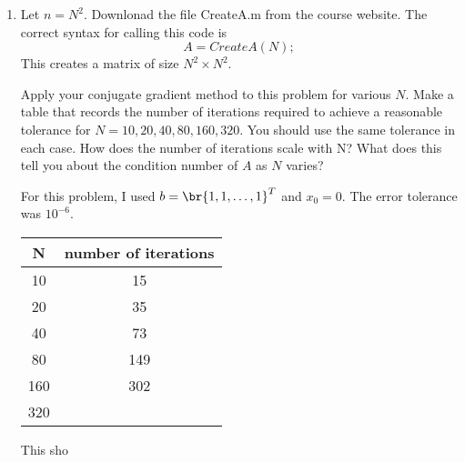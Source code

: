 \documentclass[11pt, oneside]{article}
\begin{document}
\begin{enumerate}
    \begin{proof}
      Let $A$ be symmetric and positive definite and
      let $p_0, p_1, \ldots, p_l$ be A-conjugate, that is
      \[
        p_i^T A p_j = 0 \qquad \forall i \neq j.
      \]
      Consider a set of constants $c_0, c_1, \ldots, c_l$, such that
      \[
        \sum{i = 0}{l}{c_i p_i} = 0
      \]
      The set of vectors $\set{p_i}$ are linearly independent if $c_i = 0$ for
      all $i$.
      Consider the following
      \begin{align*}
        0 &= \sum{i = 0}{l}{c_i p_i^T} A \sum{j = 0}{l}{c_j p_j} \\
        0 &= \sum{i = 0}{l}{\sum{j = 0}{l}{c_i c_j  p_i^T A p_j}}
        \intertext{Since these vectors are A-conjugate}
        0 &= \sum{i = 0}{l}{c_i^2 p_i^T A p_i}.
        \intertext{Note that since $A$ is positive definite $p_i^T A p_i > 0$
          for all $i$, and since $c_i^2 \ge 0$ this implies that}
        0 &= c_i
      \end{align*}
      This shows that $p_0, p_1, \ldots, p_l$ are linearly independent.
      Therefore any set of A-conjugate vectors must also be linearly
      independent.
      Since a set of linearly independent vectors can be at most of size $n$,
      this implies that a set of A-conjugate vectors can be at most of size $n$.
    \end{proof}

  \item %
    Let $n = N^2$.
    Downlonad the \MATLAB file CreateA.m from the course website.
    The correct syntax for calling this code is
    \[
      A = CreateA(N);
    \]
    This creates a matrix of size $N^2 \times N^2$.

    Apply your conjugate gradient method to this problem for various $N$.
    Make a table that records the number of iterations required to achieve a
    reasonable tolerance for $N = 10, 20, 40, 80, 160, 320$.
    You should use the same tolerance in each case.
    How does the number of iterations scale with N?
    What does this tell you about the condition number of $A$ as $N$ varies?

    

    For this problem, I used $b = \br{1, 1, \ldots, 1}^T$ and $x_0 = 0$.
    The error tolerance was $10^{-6}$.
    \begin{center}
      \begin{tabular}{cc}
        \toprule
        N & number of iterations \\
        \midrule
        10 & 15 \\
        20 & 35 \\
        40 & 73 \\
        80 & 149 \\
        160 & 302 \\
        320 & \\
        \bottomrule
      \end{tabular}
    \end{center}
    This sho

\end{enumerate}
\end{document}
